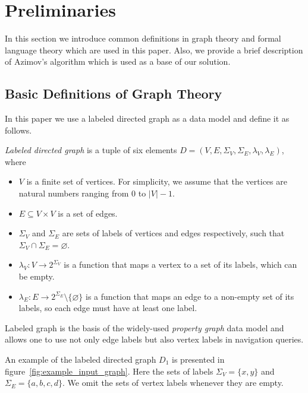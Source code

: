 \section{Preliminaries}

In this section we introduce common definitions in graph theory and formal language theory which are used in this paper.
Also, we provide a brief description of Azimov's algorithm which is used as a base of our solution.

\subsection{Basic Definitions of Graph Theory}

In this paper we use a labeled directed graph as a data model and define it as follows.
\begin{definition} \emph{Labeled directed graph} is a tuple of six elements $D = (V, E, \Sigma_V, \Sigma_E, \lambda_V, \lambda_E)$, where
\begin{itemize}
    \item $V$ is a finite set of vertices. For simplicity, we assume that the vertices are natural numbers ranging from $0$ to $|V|-1$.
    \item $E \subseteq V \times V$ is a set of edges.
    \item $\Sigma_V$ and $\Sigma_E$ are sets of labels of vertices and edges respectively, such that $\Sigma_V \cap \Sigma_E = \varnothing$.
    \item $\lambda_V : V \xrightarrow{} 2^{\Sigma_V}$ is a function that maps a vertex to a set of its labels, which can be empty.
    \item $\lambda_E : E \xrightarrow{} 2^{\Sigma_E} \setminus \{\varnothing\}$ is a function that maps an edge to a non-empty set of its labels, so each edge must have at least one label.
\end{itemize} 
\end{definition}
Labeled graph is the basis of the widely-used \textit{property graph} data model and allows one to use not only edge labels but also vertex labels in navigation queries.

An example of the labeled directed graph $D_1$ is presented in figure~\ref{fig:example_input_graph}. Here the sets of labels $\Sigma_V = \{x, y\}$ and $\Sigma_E = \{a, b, c, d\}$.
We omit the sets of vertex labels whenever they are empty.

